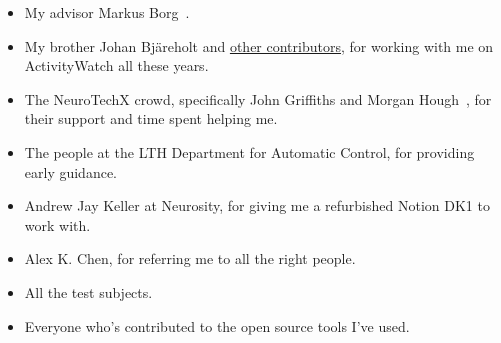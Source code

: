 \begin{itemize}
 \item My advisor Markus Borg~.
 \item My brother Johan Bjäreholt and \href{https://activitywatch.net/contributors/}{other contributors}, for working with me on ActivityWatch all these years.
 \item The NeuroTechX crowd, specifically John Griffiths and Morgan Hough~, for their support and time spent helping me.
 \item The people at the LTH Department for Automatic Control, for providing early guidance.
 \item Andrew Jay Keller at Neurosity, for giving me a refurbished Notion DK1 to work with.
 \item Alex K. Chen, for referring me to all the right people.
 \item All the test subjects.
 \item Everyone who's contributed to the open source tools I've used.
\end{itemize}
